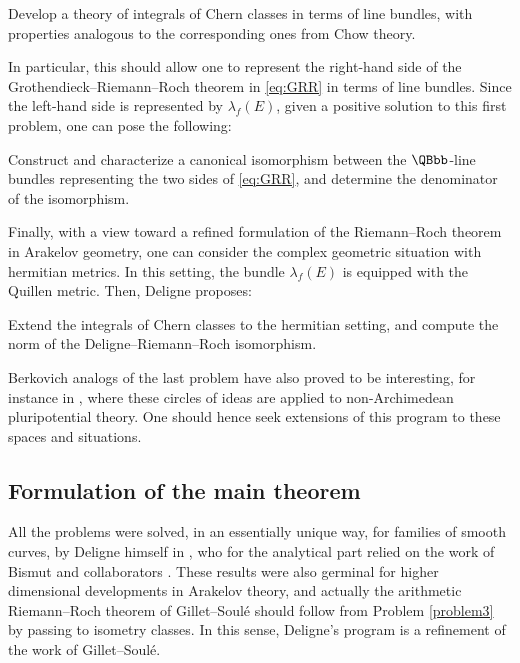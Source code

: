 \begin{problem-Deligne} \label{problem1}
Develop a theory of integrals of Chern classes in terms of line bundles, with properties analogous to the corresponding ones from Chow theory.
\end{problem-Deligne}

In particular, this should allow one to represent the right-hand side of the Grothendieck--Riemann--Roch theorem in \eqref{eq:GRR} in terms of line bundles. Since the left-hand side is represented by $\lambda_f(E)$, given a positive solution to this first problem, one can pose the following:

\begin{problem-Deligne} \label{problem2}
Construct and characterize a canonical isomorphism between the $\QBbb$-line bundles representing the two sides of \eqref{eq:GRR}, and determine the denominator of the isomorphism.
\end{problem-Deligne}

Finally, with a view toward a refined formulation of the Riemann--Roch theorem in Arakelov geometry, one can consider the complex geometric situation with hermitian metrics. In this setting, the bundle $\lambda_f(E)$ is equipped with the Quillen metric. Then, Deligne proposes:

\begin{problem-Deligne}\label{problem3}
Extend the integrals of Chern classes to the hermitian setting, and compute the norm of the Deligne--Riemann--Roch isomorphism.
\end{problem-Deligne}

Berkovich analogs of the last problem have also proved to be interesting, for instance in \cite{Boucksom-Eriksson, SebWalMarDiff}, where these circles of ideas are applied to non-Archimedean pluripotential theory. One should hence seek extensions of this program to these spaces and situations.\enlargethispage{\baselineskip}%

\subsection{Formulation of the main theorem} All the problems were solved, in an essen\-tially unique way, for families of smooth curves, by Deligne himself in \cite{Deligne-determinant}, who for the analytical part relied on the work of Bismut and collaborators \cite{freed1, freed2, BGS1, BGS2, BGS3}. These results were also germinal for higher dimensional developments in Arakelov theory, and actually the arithmetic Riemann--Roch theorem of Gillet--Soulé \cite{GS-ARR} should follow from Problem \ref{problem3} by passing to isometry classes. In this sense, Deligne's program is a refinement of the work of Gillet--Soulé.

